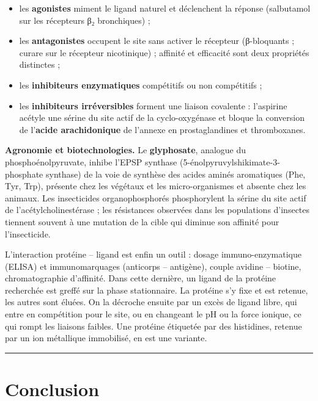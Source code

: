 \documentclass[11pt,a4paper]{article}
\providecommand{\tightlist}{\setlength{\itemsep}{0pt}\setlength{\parskip}{0pt}}
\begin{document}
\begin{itemize}
\tightlist
\item
  les \textbf{agonistes} miment le ligand naturel et déclenchent la réponse (salbutamol sur les récepteurs β₂ bronchiques) ;
\item
  les \textbf{antagonistes} occupent le site sans activer le récepteur (β-bloquants ; curare sur le récepteur nicotinique) ; affinité et efficacité sont deux propriétés distinctes ;
\item
  les \textbf{inhibiteurs enzymatiques} compétitifs ou non compétitifs ;
\item
  les \textbf{inhibiteurs irréversibles} forment une liaison covalente : l'aspirine acétyle une sérine du site actif de la cyclo-oxygénase et bloque la conversion de l'\textbf{acide arachidonique} de l'annexe en prostaglandines et thromboxanes.
\end{itemize}

\textbf{Agronomie et biotechnologies.} Le \textbf{glyphosate}, analogue du phosphoénolpyruvate, inhibe l'EPSP synthase (5-\allowbreak{}énolpyruvylshikimate-\allowbreak{}3-\allowbreak{}phosphate synthase) de la voie de synthèse des acides aminés aromatiques (Phe, Tyr, Trp), présente chez les végétaux et les micro-organismes et absente chez les animaux. Les insecticides organophosphorés phosphorylent la sérine du site actif de l'acétylcholinestérase ; les résistances observées dans les populations d'insectes tiennent souvent à une mutation de la cible qui diminue son affinité pour l'insecticide.

L'interaction protéine -- ligand est enfin un outil : dosage immuno-enzymatique (ELISA) et immunomarquages (anticorps -- antigène), couple avidine -- biotine, chromatographie d'affinité. Dans cette dernière, un ligand de la protéine recherchée est greffé sur la phase stationnaire. La protéine s'y fixe et est retenue, les autres sont éluées. On la décroche ensuite par un excès de ligand libre, qui entre en compétition pour le site, ou en changeant le pH ou la force ionique, ce qui rompt les liaisons faibles. Une protéine étiquetée par des histidines, retenue par un ion métallique immobilisé, en est une variante.

\begin{center}\rule{0.5\linewidth}{0.5pt}\end{center}

\hypertarget{conclusion}{%
\section{Conclusion}\label{conclusion}}
\end{document}
